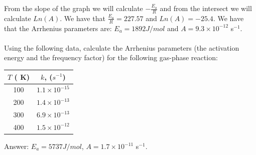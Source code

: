 \documentclass[main.tex]{subfiles}
\begin{document}
\begin{description}
\begin{example}
 \tableLabel
{}
\hspace{-0.3cm}\begin{center}\end{center}
From the slope of the graph we will calculate $-\frac{E_a}{R}$ and from the intersect we will calculate $Ln(A)$. We have that $\frac{E_a}{R}=227.57$ and $Ln(A)=-25.4$. We have that the Arrhenius parameters are: $E_a=1892J/mol$ and $A=9.3\times 10^{-12}$ s$^{-1}$.\\
\faDiamond\ \\
Using the following data, calculate the Arrhenius parameters (the activation energy and the frequency factor) for the following gas-phase reaction:
\begin{center}\end{center}
\begin{center}\begin{tabular}[t]{   c  c   }
\toprule
  $T$ ( K)	&$k$, ($s^{-1}$) \\
\midrule
100&	$1.1\times 10^{-15}$\\
200&	$1.4\times 10^{-13}$\\
300&	$6.9\times 10^{-13}$\\
400&$1.5\times 10^{-12}$\\
\bottomrule
\end{tabular}\end{center}
\flushright Answer:  $E_a=5737J/mol$, $A=1.7\times 10^{-11}$ s$^{-1}$.
\end{example}%
\end{description}
\end{document}
